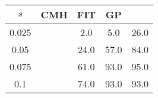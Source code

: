 \centering \begin{tabular}{c|c|c|c|c}
$s$	&CMH	&FIT	&GP	&\sc{Clear}\\\hline
0.025	&	&2.0	&5.0	&26.0\\
0.05	&	&24.0	&57.0	&84.0\\
0.075	&	&61.0	&93.0	&95.0\\
0.1	&	&74.0	&93.0	&93.0\\
\end{tabular}
